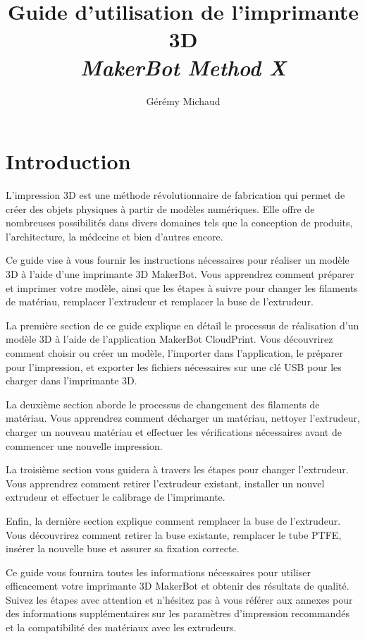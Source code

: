 \documentclass{Thesis}
\title{Guide d'utilisation de l'imprimante 3D
\\\Large{\textit{MakerBot Method X}}}
\author{Gérémy Michaud}{G. Michaud}
\begin{document}
\newpage
\tableofcontents
\clearpage

\section{Introduction}
L'impression 3D est une méthode révolutionnaire de fabrication qui permet de créer des objets physiques à partir de modèles numériques. Elle offre de nombreuses possibilités dans divers domaines tels que la conception de produits, l'architecture, la médecine et bien d'autres encore.

Ce guide vise à vous fournir les instructions nécessaires pour réaliser un modèle 3D à l'aide d'une imprimante 3D MakerBot. Vous apprendrez comment préparer et imprimer votre modèle, ainsi que les étapes à suivre pour changer les filaments de matériau, remplacer l'extrudeur et remplacer la buse de l'extrudeur.

La première section de ce guide explique en détail le processus de réalisation d'un modèle 3D à l'aide de l'application MakerBot CloudPrint. Vous découvrirez comment choisir ou créer un modèle, l'importer dans l'application, le préparer pour l'impression, et exporter les fichiers nécessaires sur une clé USB pour les charger dans l'imprimante 3D.

La deuxième section aborde le processus de changement des filaments de matériau. Vous apprendrez comment décharger un matériau, nettoyer l'extrudeur, charger un nouveau matériau et effectuer les vérifications nécessaires avant de commencer une nouvelle impression.

La troisième section vous guidera à travers les étapes pour changer l'extrudeur. Vous apprendrez comment retirer l'extrudeur existant, installer un nouvel extrudeur et effectuer le calibrage de l'imprimante.

Enfin, la dernière section explique comment remplacer la buse de l'extrudeur. Vous découvrirez comment retirer la buse existante, remplacer le tube PTFE, insérer la nouvelle buse et assurer sa fixation correcte.

Ce guide vous fournira toutes les informations nécessaires pour utiliser efficacement votre imprimante 3D MakerBot et obtenir des résultats de qualité. Suivez les étapes avec attention et n'hésitez pas à vous référer aux annexes pour des informations supplémentaires sur les paramètres d'impression recommandés et la compatibilité des matériaux avec les extrudeurs.
\end{document}
